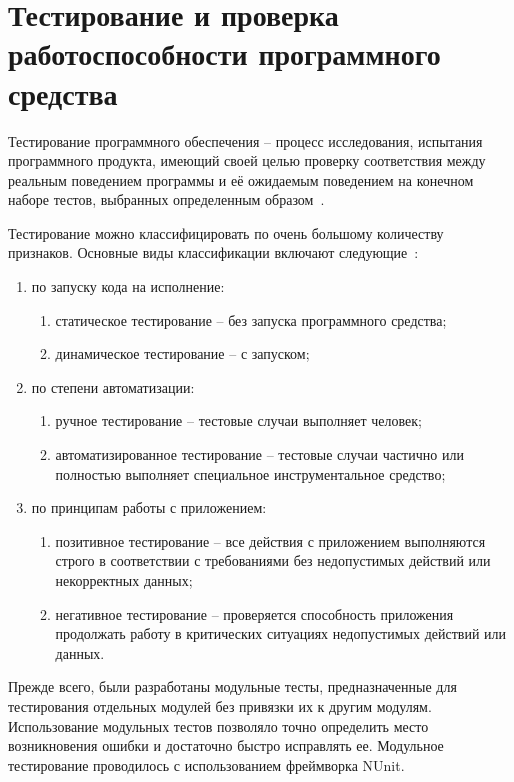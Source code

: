 \section{Тестирование и проверка работоспособности программного средства}
\label{sec:testing}

Тестирование программного обеспечения -- процесс исследования, испытания программного продукта, имеющий своей целью проверку соответствия между реальным поведением программы и её ожидаемым поведением на конечном наборе тестов, выбранных определенным образом~\cite{kulikov_testing}.

Тестирование можно классифицировать по очень большому количеству признаков. Основные виды классификации включают следующие~\cite{kulikov_testing}:

\begin{enumerate}
	\item по запуску кода на исполнение:
	\begin{enumerate}
		\item статическое тестирование -- без запуска программного средства;
		\item динамическое тестирование -- с запуском;
	\end{enumerate}
	\item по степени автоматизации:
	\begin{enumerate}
		\item ручное тестирование -- тестовые случаи выполняет человек;
		\item автоматизированное тестирование -- тестовые случаи частично или полностью выполняет специальное инструментальное средство;
	\end{enumerate}
	\item по принципам работы с приложением:
	\begin{enumerate}
		\item позитивное тестирование -- все действия с приложением выполняются строго в соответствии с требованиями без недопустимых действий или некорректных данных;
		\item негативное тестирование -- проверяется способность приложения продолжать работу в критических ситуациях недопустимых действий или данных.
	\end{enumerate}
\end{enumerate}

Прежде  всего,  были  разработаны  модульные  тесты,  предназначенные для  тестирования  отдельных  модулей  без  привязки  их  к  другим  модулям. Использование модульных тестов позволяло точно определить место возникновения ошибки и достаточно быстро исправлять ее. Модульное тестирование проводилось с использованием фреймворка NUnit. 

